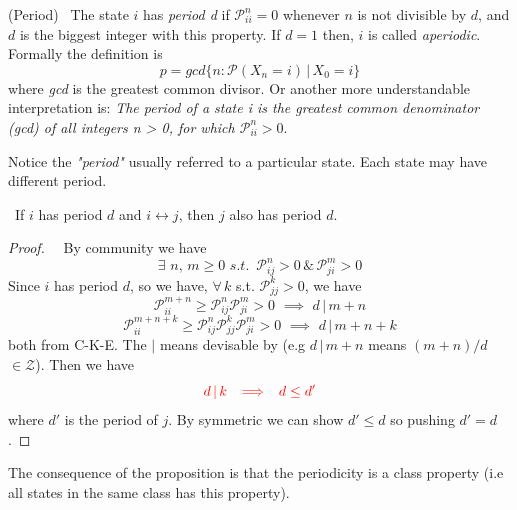 \documentclass[10.5pt]{article}
\newcommand{\prob}[0]{\mathcal{P}}
\newenvironment{changemargin}[2]{%
  \begin{list}{}{%
    \setlength{\topsep}{0pt}%
    \setlength{\leftmargin}{#1}%
    \setlength{\rightmargin}{#2}%
    \setlength{\listparindent}{\parindent}%
    \setlength{\itemindent}{\parindent}%
    \setlength{\parsep}{\parskip}%
  }%
  \item[]}{\end{list}}
\begin{document}
\begin{changemargin}{-0.125in}{0in}
\begin{enumerate}
\begin{enumerate}
       
      \begin{center}
      	
        
       \end{center}
       
       \medskip
       
       
       \begin{definition}(Period) \,\,\,The state $i$ has \textit{period d} if $\mathcal{P}_{ii}^n = 0$ whenever $n$ is not divisible by $d$, and $d$ is the biggest integer with this property. If $d=1$ then, $i$ is called \textit{aperiodic}. Formally the definition is 
       \[
       p = gcd\{n : \mathcal{P}(X_n = i) \,|\, X_0 = i\}
       \]
       where \textit{gcd} is the greatest common divisor. Or another more understandable interpretation is: \textit{The period of a state i is the greatest common denominator (gcd) of all integers n > 0, for which $\mathcal{P}_{ii}^n>0$}.
       \end{definition}
       
       \medskip
       
       Notice the \textit{"period"} usually referred to a particular state. Each state may have different period. 
       
       \medskip
       
       \begin{proposition}\,\,\,If $i$ has period $d$ and $i \leftrightarrow j$, then $j$ also has period $d$.
           \begin{proof}\,\,\,\, By community we have 
           \[
           \exists \,\, n ,\, m \geq 0\,\,s.t. \,\,\,\prob_{ij}^n >0 \,\&\,\prob_{ji}^m > 0
           \]
       	   Since $i$ has period $d$, so we have, $\forall\,k$ s.t. $\prob_{jj}^k > 0$, we have
       	   \[
       	   \prob_{ii}^{m+n} \geq \prob_{ij}^n \prob_{ji}^m > 0\,\, \implies \,\, d \,|\, m+n
       	   \]
       	   \[
       	   \prob_{ii}^{m+n+k} \geq \prob_{ij}^n \prob_{jj}^k \prob_{ji}^m > 0\,\, \implies \,\, d \,|\, m+n+k
       	   \]
       	   both from C-K-E. The $|$ means devisable by (e.g $d \,|\, m+n$ means $(m+n)/d$ $\in \mathcal{Z}$). Then we have 
       	   \[
       	   \textcolor{red}{d \, |\, k \,\,\, \implies \,\,\,d \leq d'}
       	   \]
       	   where $d'$ is the period of $j$. By symmetric we can show $d' \leq d$ so pushing $d' = d$.
           \end{proof}
           The consequence of the proposition is that the periodicity is a class property (i.e all states in the same class has this property). 
       \end{proposition}
       

\end{enumerate}
\end{enumerate}
\end{changemargin}
\end{document}
